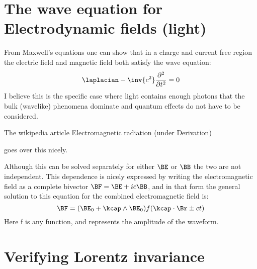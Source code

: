 \section{The wave equation for Electrodynamic fields (light)}

From Maxwell's equations one can show that in a charge and current free region
the electric field and magnetic field both satisfy the wave equation:
%
\begin{equation}
\laplacian - \inv{c^2}\frac{\partial^2}{\partial t^2} = 0
\end{equation}
%
I believe this is the specific case where light contains enough
photons that the bulk (wavelike) phenomena dominate and quantum effects do not have to be considered.

The wikipedia article Electromagnetic radiation (under Derivation)


goes over this nicely.

Although this can be solved separately for either \(\BE\) or \(\BB\) the two are not independent.
This dependence is nicely expressed by writing the electromagnetic field as a complete
bivector \(\BF = \BE + i c \BB\), and in that form the
general solution to this equation for the combined electromagnetic
field is:
%
\begin{equation}
\BF = (\BE_0 + \kcap \wedge \BE_0) f( \kcap \cdot \Br \pm c t)
\end{equation}
%
Here f is any function, and represents the amplitude of the waveform.

\section{Verifying Lorentz invariance}

